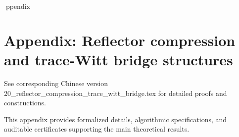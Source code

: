 ppendix

\section*{Appendix: Reflector compression and trace-Witt bridge structures}

See corresponding Chinese version 20_reflector_compression_trace_witt_bridge.tex for detailed proofs and constructions.

This appendix provides formalized details, algorithmic specifications, and auditable certificates supporting the main theoretical results.
